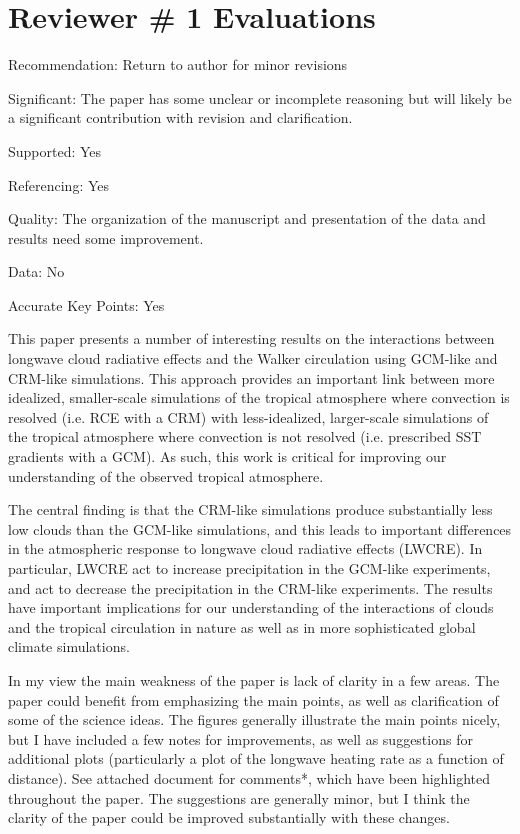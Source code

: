 \documentclass[draft]{agujournal2019}
\begin{document}
\section{Reviewer \# 1 Evaluations}

Recommendation: Return to author for minor revisions

Significant: The paper has some unclear or incomplete reasoning but will likely be a significant contribution with revision and 
clarification.

Supported: Yes

Referencing: Yes

Quality: The organization of the manuscript and presentation of the data and results need some improvement.

Data: No

Accurate Key Points: Yes

This paper presents a number of interesting results on the interactions between longwave cloud
radiative effects and the Walker circulation using GCM-like and CRM-like simulations. This
approach provides an important link between more idealized, smaller-scale simulations of the
tropical atmosphere where convection is resolved (i.e. RCE with a CRM) with less-idealized,
larger-scale simulations of the tropical atmosphere where convection is not resolved (i.e.
prescribed SST gradients with a GCM). As such, this work is critical for improving our
understanding of the observed tropical atmosphere.

The central finding is that the CRM-like simulations produce substantially less low clouds than
the GCM-like simulations, and this leads to important differences in the atmospheric response to
longwave cloud radiative effects (LWCRE). In particular, LWCRE act to increase precipitation
in the GCM-like experiments, and act to decrease the precipitation in the CRM-like experiments.
The results have important implications for our understanding of the interactions of clouds and
the tropical circulation in nature as well as in more sophisticated global climate simulations.

In my view the main weakness of the paper is lack of clarity in a few areas. The paper could
benefit from emphasizing the main points, as well as clarification of some of the science ideas.
The figures generally illustrate the main points nicely, but I have included a few notes for
improvements, as well as suggestions for additional plots (particularly a plot of the longwave
heating rate as a function of distance). See attached document for comments*, which have been
highlighted throughout the paper. The suggestions are generally minor, but I think the clarity of
the paper could be improved substantially with these changes.
\end{document}
